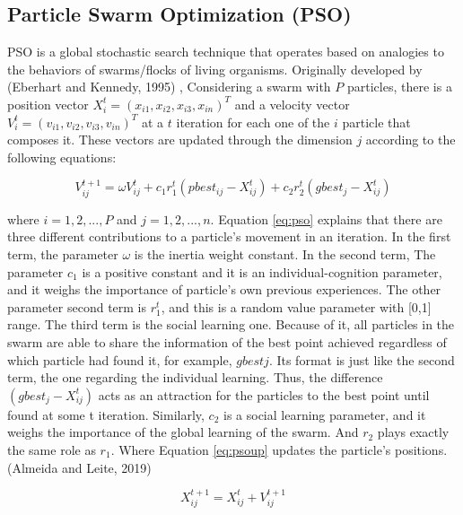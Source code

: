 \documentclass[]{elsarticle} %
\begin{document}
\hypertarget{particle-swarm-optimization-pso}{%
\subsection{Particle Swarm Optimization (PSO)}\label{particle-swarm-optimization-pso}}

PSO is a global stochastic search technique that operates based on analogies to the behaviors of swarms/flocks of living organisms. Originally developed by (Eberhart and Kennedy, 1995) , Considering a swarm with \(P\) particles, there is a position vector \(X_{i}^{t}=(x_{i1},x_{i2}, x_{i3},x_{in})^T\) and a velocity vector \(V^t_i=(v_{i1},v_{i2},v_{i3},v_{in})^T\) at a \(t\) iteration for each one of the \(i\) particle that composes it. These vectors are updated through the dimension \(j\) according to the following equations:

\begin{equation}
V^{t+1}_{ij} = \omega V^{t}_{ij} + c_{1}r_{1}^{t}(pbest_{ij}-X_{ij}^t) + c_2r_2^t(gbest_j-X_{ij}^{t})
\label{eq:pso}
\end{equation}

where \(i=1,2,..., P\) and \(j =1,2,...,n\). Equation \eqref{eq:pso} explains that there are three different contributions to a particle's movement in an iteration. In the first term, the parameter \(\omega\) is the inertia weight constant. In the second term, The parameter \(c_1\) is a positive constant and it is an individual-cognition parameter, and it weighs the importance of particle's own previous experiences. The other parameter second term is \(r_1^t\), and this is a random value parameter with {[}0,1{]} range. The third term is the social learning one. Because of it, all particles in the swarm are able to share the information of the best point achieved regardless of which particle had found it, for example, \(gbestj\). Its format is just like the second term, the one regarding the individual learning. Thus, the difference \((gbest_j - X^t_{ij})\) acts as an attraction for the particles to the best point until found at some t iteration. Similarly, \(c_2\) is a social learning parameter, and it weighs the importance of the global learning of the swarm. And \(r_2\) plays exactly the same role as \(r_1\). Where Equation \eqref{eq:psoup} updates the particle's positions. (Almeida and Leite, 2019)

\begin{equation}
X_{ij}^{t+1} = X_{ij}^{t} + V_{ij}^{t+1}
\label{eq:psoup}
\end{equation}
\end{document}
